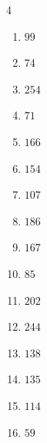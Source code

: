 \begin{multicols}{4}
\begin{enumerate}
  \item $99$


  \item $74$


  \item $254$


  \item $71$


  \item $166$


  \item $154$


  \item $107$


  \item $186$


  \item $167$


  \item $85$


\columnbreak %

  \item $202$


  \item $244$


  \item $138$


  \item $135$


  \item $114$


  \item $59$


\end{enumerate}
\end{multicols}
